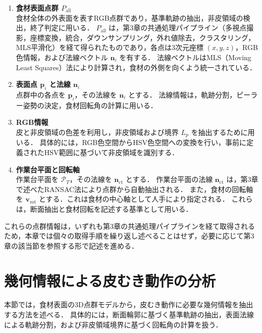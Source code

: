 \begin{enumerate}
  \item \textbf{食材表面点群 $P_{\mathrm{all}}$} \\
  食材全体の外表面を表すRGB点群であり，基準軌跡の抽出，非皮領域の検出，終了判定に用いる．
  $P_{\mathrm{all}}$ は，第3章の共通処理パイプライン（多視点撮影，座標変換，統合，ダウンサンプリング，外れ値除去，クラスタリング，MLS平滑化）を経て得られたものであり，各点は3次元座標 $(x, y, z)$，RGB色情報，および法線ベクトル $\mathbf{n}_i$ を有する．
  法線ベクトルはMLS（Moving Least Squares）法\cite{PCL-MLS}により計算され，食材の外側を向くよう統一されている．

  \item \textbf{表面点 $\mathbf{p}_i$ と法線 $\mathbf{n}_i$} \\
  点群中の各点を $\mathbf{p}_i$，その法線を $\mathbf{n}_i$ とする．
  法線情報は，軌跡分割，ピーラー姿勢の決定，食材回転角の計算に用いる．

  \item \textbf{RGB情報} \\
  皮と非皮領域の色差を利用し，非皮領域および境界 $L_p$ を抽出するために用いる．
  具体的には，RGB色空間からHSV色空間への変換を行い，事前に定義されたHSV範囲に基づいて非皮領域を識別する．

  \item \textbf{作業台平面と回転軸} \\
  作業台平面を $\mathcal{P}_T$，その法線を $\mathbf{n}_{\mathrm{ct}}$ とする．
  作業台平面の法線 $\mathbf{n}_{\mathrm{ct}}$ は，第3章で述べたRANSAC法\cite{PCL-RANSAC}により点群から自動抽出される．
  また，食材の回転軸を $\mathbf{v}_{\mathrm{rot}}$ とする．これは食材の中心軸として人手により指定される．
  これらは，断面抽出と食材回転を記述する基準として用いる．
\end{enumerate}

これらの点群情報は，いずれも第3章の共通処理パイプラインを経て取得されるため，本章では個々の取得手順を繰り返し述べることはせず，必要に応じて第3章の該当節を参照する形で記述を進める．

\section{幾何情報による皮むき動作の分析}
\label{sec:peeling_phase_geo}

本節では，食材表面の3D点群モデルから，皮むき動作に必要な幾何情報を抽出する方法を述べる．
具体的には，断面輪郭に基づく基準軌跡の抽出，表面法線による軌跡分割，および非皮領域境界に基づく回転角の計算を扱う．

